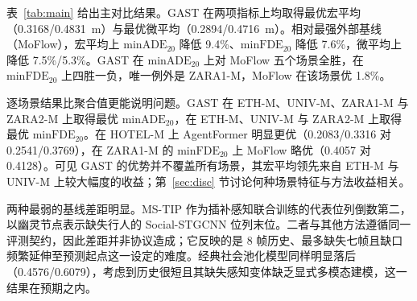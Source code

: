 表~\ref{tab:main} 给出主对比结果。GAST 在两项指标上均取得最优宏平均（0.3168/0.4831~m）与最优微平均（0.2894/0.4716~m）。相对最强外部基线（MoFlow），宏平均上 $\mathrm{minADE}_{20}$ 降低 9.4\%、$\mathrm{minFDE}_{20}$ 降低 7.6\%，微平均上降低 7.5\%/5.3\%。GAST 在 $\mathrm{minADE}_{20}$ 上对 MoFlow 五个场景全胜，在 $\mathrm{minFDE}_{20}$ 上四胜一负，唯一例外是 ZARA1-M，MoFlow 在该场景优 1.8\%。

逐场景结果比聚合值更能说明问题。GAST 在 ETH-M、UNIV-M、ZARA1-M 与 ZARA2-M 上取得最优 $\mathrm{minADE}_{20}$，在 ETH-M、UNIV-M 与 ZARA2-M 上取得最优 $\mathrm{minFDE}_{20}$。在 HOTEL-M 上 AgentFormer 明显更优（0.2083/0.3316 对 0.2541/0.3769），在 ZARA1-M 的 $\mathrm{minFDE}_{20}$ 上 MoFlow 略优（0.4057 对 0.4128）。可见 GAST 的优势并不覆盖所有场景，其宏平均领先来自 ETH-M 与 UNIV-M 上较大幅度的收益；第~\ref{sec:disc} 节讨论何种场景特征与方法收益相关。

两种最弱的基线差距明显。MS-TIP 作为插补感知联合训练的代表位列倒数第二，以幽灵节点表示缺失行人的 Social-STGCNN 位列末位。二者与其他方法遵循同一评测契约，因此差距并非协议造成；它反映的是 8 帧历史、最多缺失七帧且缺口频繁延伸至预测起点这一设定的难度。经典社会池化模型同样明显落后（0.4576/0.6079），考虑到历史很短且其缺失感知变体缺乏显式多模态建模，这一结果在预期之内。


